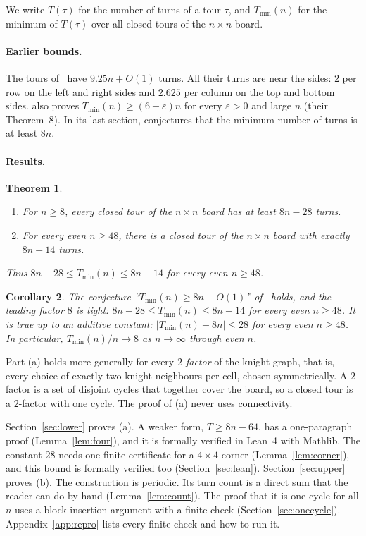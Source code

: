 \documentclass[11pt]{article}
\newtheorem{theorem}{Theorem}
\newtheorem{corollary}[theorem]{Corollary}
\theoremstyle{definition}
\theoremstyle{remark}
\newcommand{\Tmin}{T_{\min}}
\begin{document}
We write $T(\tau)$ for the number of turns of a tour $\tau$, and $\Tmin(n)$ for the minimum of $T(\tau)$ over all closed tours of the $n\times n$ board.

\paragraph{Earlier bounds.}
The tours of~\cite{bjmow} have $9.25n+O(1)$ turns.
All their turns are near the sides: $2$ per row on the left and right sides and $2.625$ per column on the top and bottom sides.
\cite{bjmow} also proves $\Tmin(n)\ge(6-\varepsilon)n$ for every $\varepsilon>0$ and large $n$ (their Theorem~8).
In its last section, \cite{bjmow} conjectures that the minimum number of turns is at least $8n$.

\paragraph{Results.}

\begin{theorem}\label{thm:main}
\begin{enumerate}
\item[(a)] For $n\ge 8$, every closed tour of the $n\times n$ board has at least $8n-28$ turns.
\item[(b)] For every even $n\ge 48$, there is a closed tour of the $n\times n$ board with exactly $8n-14$ turns.
\end{enumerate}
Thus $8n-28\le \Tmin(n)\le 8n-14$ for every even $n\ge 48$.
\end{theorem}

\begin{corollary}\label{cor:conj}
The conjecture ``$\Tmin(n)\ge 8n-O(1)$'' of~\cite{bjmow} holds, and the leading factor $8$ is tight: $8n-28\le \Tmin(n)\le 8n-14$ for every even $n\ge 48$.
It is true up to an additive constant: $|\Tmin(n)-8n|\le 28$ for every even $n\ge 48$.
In particular, $\Tmin(n)/n\to 8$ as $n\to\infty$ through even $n$.
\end{corollary}

Part (a) holds more generally for every \emph{$2$-factor} of the knight graph, that is, every choice of exactly two knight neighbours per cell, chosen symmetrically.
A $2$-factor is a set of disjoint cycles that together cover the board, so a closed tour is a $2$-factor with one cycle.
The proof of (a) never uses connectivity.

Section~\ref{sec:lower} proves (a).
A weaker form, $T\ge 8n-64$, has a one-paragraph proof (Lemma~\ref{lem:four}), and it is formally verified in Lean~4 with Mathlib.
The constant $28$ needs one finite certificate for a $4\times4$ corner (Lemma~\ref{lem:corner}), and this bound is formally verified too (Section~\ref{sec:lean}).
Section~\ref{sec:upper} proves (b).
The construction is periodic.
Its turn count is a direct sum that the reader can do by hand (Lemma~\ref{lem:count}).
The proof that it is one cycle for all $n$ uses a block-insertion argument with a finite check (Section~\ref{sec:onecycle}).
Appendix~\ref{app:repro} lists every finite check and how to run it.
\end{document}
